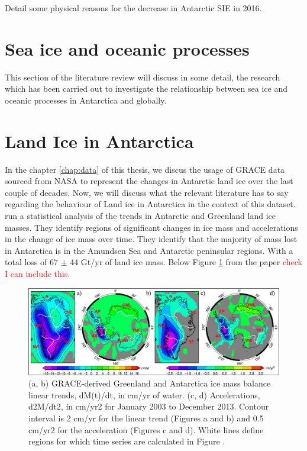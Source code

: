 \documentclass[../main.tex]{subfiles}
\begin{document}
\cite{Turner2020a} Detail some physical reasons for the decrease in Antarctic SIE in 2016.


\section{Sea ice and oceanic processes}
This section of the literature review will discuss in some detail, the research which has been carried out to investigate the relationship between sea ice and oceanic processes in Antarctica and globally.


\section{Land Ice in Antarctica}
In the chapter \ref{chap:data} of this thesis, we discus the usage of GRACE data sourced from NASA to represent the changes in Antarctic land ice over the last couple of decades. Now, we will discuss what the relevant literature has to say regarding the behaviour of Land ice in Antarctica in the context of this dataset. \cite{Velicogna2014RegionalData} run a statistical analysis of the trends in Antarctic and Greenland land ice masses. They identify regions of significant changes in ice mass and accelerations in the change of ice mass over time. They identify that the majority of mass lost in Antarctica is in the Amundsen Sea and Antarctic peninsular regions. With a total loss of 67 $\pm$ 44 Gt/yr of land ice mass. Below Figure \ref{fig:ice_mass_from_paper} from the paper \textcolor{red}{check I can include this.}
\begin{figure}[hbt!]
    \centering
    \includegraphics[width=\textwidth]{images/from_papers/grl52143-fig-0001-m.jpg}
    \caption{(a, b) GRACE‐derived Greenland and Antarctica ice mass balance linear trends, dM(t)/dt, in cm/yr of water. (c, d) Accelerations, d2M/dt2, in cm/yr2 for January 2003 to December 2013. Contour interval is 2 cm/yr for the linear trend (Figures a and b) and 0.5 cm/yr2 for the acceleration (Figures c and d). White lines define regions for which time series are calculated in Figure .}
    \label{fig:ice_mass_from_paper}
\end{figure}
\end{document}

